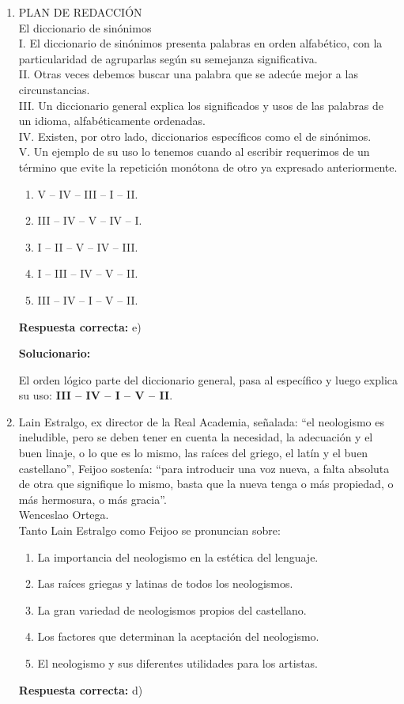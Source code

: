 \begin{enumerate}[resume]
	\item PLAN DE REDACCIÓN\\
	El diccionario de sinónimos\\
	I. El diccionario de sinónimos presenta palabras en orden alfabético, con la particularidad de agruparlas según su semejanza significativa.\\
	II. Otras veces debemos buscar una palabra que se adecúe mejor a las circunstancias.\\
	III. Un diccionario general explica los significados y usos de las palabras de un idioma, alfabéticamente ordenadas.\\
	IV. Existen, por otro lado, diccionarios específicos como el de sinónimos.\\
	V. Un ejemplo de su uso lo tenemos cuando al escribir requerimos de un término que evite la repetición monótona de otro ya expresado anteriormente.
	\begin{enumerate}[label=\alph*)]
		\item V – IV – III – I – II.
		\item III – IV – V – IV – I.
		\item I – II – V – IV – III.
		\item I – III – IV – V – II.
		\item III – IV – I – V – II.
	\end{enumerate}
	\textbf{Respuesta correcta:} e)
	
	\vspace{2mm}
	\textbf{Solucionario:}
	
	El orden lógico parte del diccionario general, pasa al específico y luego explica su uso: \textbf{III – IV – I – V – II}.
	
	\vspace{6mm}
	
	\item Lain Estralgo, ex director de la Real Academia, señalada: “el neologismo es ineludible, pero se deben tener en cuenta la necesidad, la adecuación y el buen linaje, o lo que es lo mismo, las raíces del griego, el latín y el buen castellano”, Feijoo sostenía: “para introducir una voz nueva, a falta absoluta de otra que signifique lo mismo, basta que la nueva tenga o más propiedad, o más hermosura, o más gracia”.\\
	Wenceslao Ortega.\\
	Tanto Lain Estralgo como Feijoo se pronuncian sobre:
	\begin{enumerate}[label=\alph*)]
		\item La importancia del neologismo en la estética del lenguaje.
		\item Las raíces griegas y latinas de todos los neologismos.
		\item La gran variedad de neologismos propios del castellano.
		\item Los factores que determinan la aceptación del neologismo.
		\item El neologismo y sus diferentes utilidades para los artistas.
	\end{enumerate}
	\textbf{Respuesta correcta:} d)
	

\end{enumerate}
